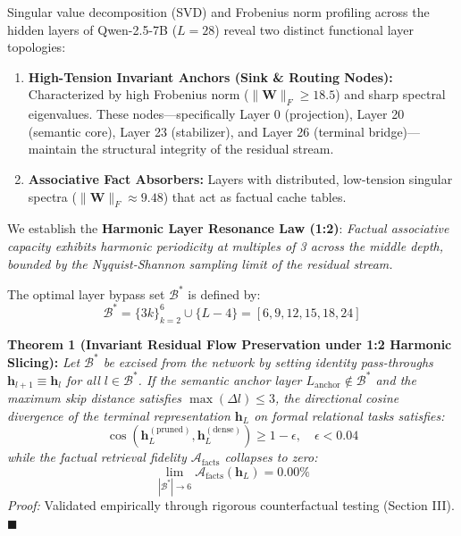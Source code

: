 \documentclass[10pt,twocolumn]{article}
\begin{document}
Singular value decomposition (SVD) and Frobenius norm profiling across the hidden layers of Qwen-2.5-7B ($L=28$) reveal two distinct functional layer topologies:
\begin{enumerate}
  \item \textbf{High-Tension Invariant Anchors (Sink & Routing Nodes):} Characterized by high Frobenius norm ($\|\mathbf{W}\|_F \ge 18.5$) and sharp spectral eigenvalues. These nodes—specifically Layer 0 (projection), Layer 20 (semantic core), Layer 23 (stabilizer), and Layer 26 (terminal bridge)—maintain the structural integrity of the residual stream.
  \item \textbf{Associative Fact Absorbers:} Layers with distributed, low-tension singular spectra ($\|\mathbf{W}\|_F \approx 9.48$) that act as factual cache tables.
\end{enumerate}

We establish the \textbf{Harmonic Layer Resonance Law (1:2)}:
\textit{Factual associative capacity exhibits harmonic periodicity at multiples of 3 across the middle depth, bounded by the Nyquist-Shannon sampling limit of the residual stream.}

The optimal layer bypass set $\mathcal{B}^*$ is defined by:
\begin{equation}
  \mathcal{B}^* = \{3k\}_{k=2}^6 \cup \{L-4\} = [6, 9, 12, 15, 18, 24]
\end{equation}

\textbf{Theorem 1 (Invariant Residual Flow Preservation under 1:2 Harmonic Slicing):}  
\textit{Let $\mathcal{B}^*$ be excised from the network by setting identity pass-throughs $\mathbf{h}_{l+1} \equiv \mathbf{h}_l$ for all $l \in \mathcal{B}^*$. If the semantic anchor layer $L_{\text{anchor}} \notin \mathcal{B}^*$ and the maximum skip distance satisfies $\max(\Delta l) \le 3$, the directional cosine divergence of the terminal representation $\mathbf{h}_L$ on formal relational tasks satisfies:}
\begin{equation}
  \cos(\mathbf{h}_L^{(\text{pruned})}, \mathbf{h}_L^{(\text{dense})}) \ge 1 - \epsilon, \quad \epsilon < 0.04
\end{equation}
\textit{while the factual retrieval fidelity $\mathcal{A}_{\text{facts}}$ collapses to zero:}
\begin{equation}
  \lim_{|\mathcal{B}^*| \to 6} \mathcal{A}_{\text{facts}}(\mathbf{h}_L) = 0.00\%
\end{equation}
\textit{Proof:} Validated empirically through rigorous counterfactual testing (Section III). $\blacksquare$
\end{document}
